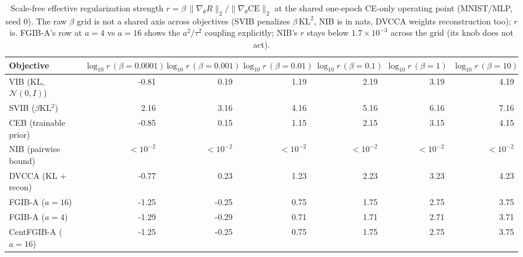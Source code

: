 \begin{table}[t]
\caption{Scale-free effective regularization strength $r = \beta\,\lVert\nabla_\theta R\rVert_2/\lVert\nabla_\theta \mathrm{CE}\rVert_2$ at the shared one-epoch CE-only operating point (MNIST/MLP, seed 0). The raw $\beta$ grid is not a shared axis across objectives (SVIB penalizes $\beta\,\mathrm{KL}^2$, NIB is in nats, DVCCA weights reconstruction too); $r$ is. FGIB-A's row at $a{=}4$ vs $a{=}16$ shows the $a^2/\tau^2$ coupling explicitly; NIB's $r$ stays below $1.7\times10^{-3}$ across the grid (its knob does not act).}
\label{tab:effective}
\begin{center}\small
\begin{tabular}{lrrrrrr}
Objective & $\log_{10} r\,(\beta=0.0001)$ & $\log_{10} r\,(\beta=0.001)$ & $\log_{10} r\,(\beta=0.01)$ & $\log_{10} r\,(\beta=0.1)$ & $\log_{10} r\,(\beta=1)$ & $\log_{10} r\,(\beta=10)$ \\ \hline
VIB (KL, $\mathcal{N}(0,I)$) & -0.81 & 0.19 & 1.19 & 2.19 & 3.19 & 4.19 \\
SVIB ($\beta$KL$^2$) & 2.16 & 3.16 & 4.16 & 5.16 & 6.16 & 7.16 \\
CEB (trainable prior) & -0.85 & 0.15 & 1.15 & 2.15 & 3.15 & 4.15 \\
NIB (pairwise bound) & $<\!10^{-2}$ & $<\!10^{-2}$ & $<\!10^{-2}$ & $<\!10^{-2}$ & $<\!10^{-2}$ & $<\!10^{-2}$ \\
DVCCA (KL $+$ recon) & -0.77 & 0.23 & 1.23 & 2.23 & 3.23 & 4.23 \\
FGIB-A ($a{=}16$) & -1.25 & -0.25 & 0.75 & 1.75 & 2.75 & 3.75 \\
FGIB-A ($a{=}4$) & -1.29 & -0.29 & 0.71 & 1.71 & 2.71 & 3.71 \\
CentFGIB-A ($a{=}16$) & -1.25 & -0.25 & 0.75 & 1.75 & 2.75 & 3.75 \\
\end{tabular}\end{center}\end{table}